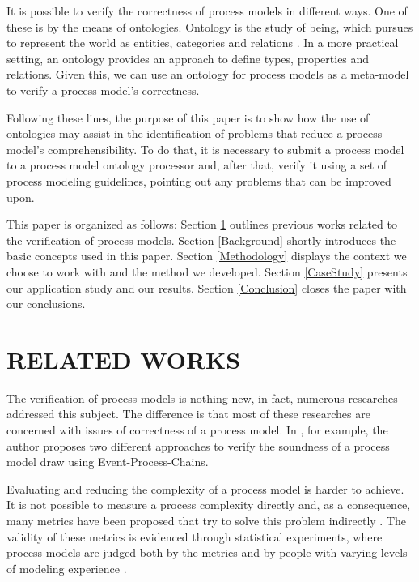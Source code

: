 \documentclass[a4paper,twoside]{article}
\begin{document}
It is possible to verify the correctness of process models in  different ways. One of these is by the means of ontologies. Ontology is the study of being, which pursues to represent the world as entities, categories and relations \citep{Guizzardi2012,Mendling2008}. In a more practical setting, an ontology provides an approach to define types, properties and relations. Given this, we can use an ontology for process models as a meta-model to verify a process model's correctness.


Following these lines, the purpose of this paper is to show how the use of ontologies may assist in the identification of problems that reduce a process model's comprehensibility. To do that, it is necessary to submit a process model to a process model ontology processor and, after that, verify it using a set of process modeling guidelines, pointing out any problems that can be improved upon.


This paper is organized as follows: Section \ref{RelatedWorks} outlines previous works related to the verification of process models. Section \ref{Background} shortly introduces the basic concepts used in this paper. Section \ref{Methodology} displays the context we choose to work with and the method we developed. Section \ref{CaseStudy} presents our application study and our results. Section \ref{Conclusion} closes the paper with our conclusions.

\section{RELATED WORKS}\label{RelatedWorks}


\noindent The verification of process models is nothing new, in fact, numerous researches addressed this subject. The difference is that most of these researches are concerned with issues of correctness of a process model. In \citet{Mendling2008}, for example, the author proposes two different approaches to verify the soundness of a process model draw using Event-Process-Chains.
	
Evaluating and reducing the complexity of a process model is harder to achieve. It is not possible to measure a process complexity directly and, as a consequence, many metrics have been proposed that try to solve this problem indirectly \citep{Vanderfeesten2007,Mendling2008b,Gruhn2006}. The validity of these metrics is evidenced through statistical experiments, where process models are judged both by the metrics and by people with varying levels of modeling experience \citep{Cardoso2006a,Sanchez-Gonzalez2008}.
\end{document}

